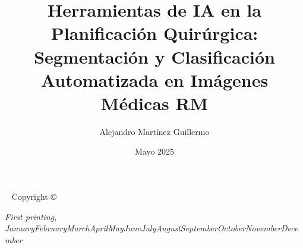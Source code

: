 \documentclass[a4paper,justified,titlepage.nobib]{tufte-book}
\title[Herramientas IA en la Planificación Quirúrgica]{Herramientas de IA en la Planificación Quirúrgica: Segmentación y Clasificación Automatizada en Imágenes Médicas RM}
\date{Mayo 2025}
\author[Alejandro Martínez Guillermo{Alejandro Martínez Guillermo}]{Alejandro Martínez Guillermo}
\newcommand{\monthyear}{\ifcase\month\or January\or February\or March\or April\or May\or June\or July\or August\or September\or October\or November\or December\fi\space\number\year} %
\begin{document}



\frontmatter
\maketitle


\newpage
\begin{fullwidth}
~\vfill
\thispagestyle{empty}
\setlength{\parindent}{0pt}
\setlength{\parskip}{\baselineskip}
Copyright \copyright\ \the\year\ \thanklessauthor

\par{}
\par{}



\par\textit{First printing, \monthyear}
\end{fullwidth}


\cleardoublepage


\cleardoublepage
\end{document}
